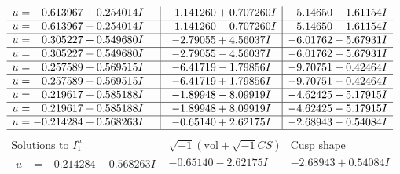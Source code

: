 \documentclass[1p]{elsarticle_modified}
\theoremstyle{definition}
\newcommand{\I}{\sqrt{-1}}
\begin{document}
$$\begin{array}{c|c|c}
\begin{aligned}
u &= \phantom{-}0.613967 + 0.254014 I\end{aligned}
 & \phantom{-}1.141260 + 0.707260 I & \phantom{-}5.14650 - 1.61154 I \\ \hline\begin{aligned}
u &= \phantom{-}0.613967 - 0.254014 I\end{aligned}
 & \phantom{-}1.141260 - 0.707260 I & \phantom{-}5.14650 + 1.61154 I \\ \hline\begin{aligned}
u &= \phantom{-}0.305227 + 0.549680 I\end{aligned}
 & -2.79055 + 4.56037 I & -6.01762 - 5.67931 I \\ \hline\begin{aligned}
u &= \phantom{-}0.305227 - 0.549680 I\end{aligned}
 & -2.79055 - 4.56037 I & -6.01762 + 5.67931 I \\ \hline\begin{aligned}
u &= \phantom{-}0.257589 + 0.569515 I\end{aligned}
 & -6.41719 - 1.79856 I & -9.70751 + 0.42464 I \\ \hline\begin{aligned}
u &= \phantom{-}0.257589 - 0.569515 I\end{aligned}
 & -6.41719 + 1.79856 I & -9.70751 - 0.42464 I \\ \hline\begin{aligned}
u &= \phantom{-}0.219617 + 0.585188 I\end{aligned}
 & -1.89948 - 8.09919 I & -4.62425 + 5.17915 I \\ \hline\begin{aligned}
u &= \phantom{-}0.219617 - 0.585188 I\end{aligned}
 & -1.89948 + 8.09919 I & -4.62425 - 5.17915 I \\ \hline\begin{aligned}
u &= -0.214284 + 0.568263 I\end{aligned}
 & -0.65140 + 2.62175 I & -2.68943 - 0.54084 I\\
 \hline 
 \end{array}$$\newpage$$\begin{array}{c|c|c}  
\text{Solutions to }I^u_{1}& \I (\text{vol} + \sqrt{-1}CS) & \text{Cusp shape}\\
 \hline 
\begin{aligned}
u &= -0.214284 - 0.568263 I\end{aligned}
 & -0.65140 - 2.62175 I & -2.68943 + 0.54084 I \\ \hline\begin{aligned}

\end{aligned}
\end{array}$$
\end{document}
